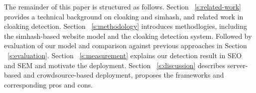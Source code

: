 The remainder of this paper is structured as follows. Section
~\autoref{s:related-work} provides a
technical background on cloaking and simhash, and related work in cloaking
detection. Section ~\autoref{s:methodology} introduces methodlogies, including the simhash-based website
model and the cloaking detection system.
Followed by evaluation of our model and comparison against previous approaches
in Section ~\autoref{s:evaluation}.
Section ~\autoref{s:measurement} explains our detection result in SEO and SEM
and motivate the deployment.
Section ~\autoref{s:discussion} describes server-based and crowdsource-based
deployment, proposes the frameworks and corresponding pros and cons.




